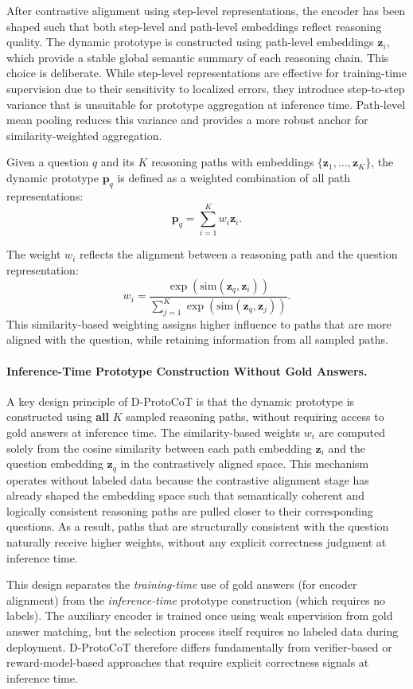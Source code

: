 \documentclass[a4paper,fleqn]{cas-dc}
\begin{document}
After contrastive alignment using step-level representations, the encoder has been shaped such that both step-level and path-level embeddings reflect reasoning quality.
The dynamic prototype is constructed using path-level embeddings $\mathbf{z}_i$, which provide a stable global semantic summary of each reasoning chain.
This choice is deliberate. While step-level representations are effective for training-time supervision due to their sensitivity to localized errors, they introduce step-to-step variance that is unsuitable for prototype aggregation at inference time.
Path-level mean pooling reduces this variance and provides a more robust anchor for similarity-weighted aggregation.

Given a question $q$ and its $K$ reasoning paths with embeddings $\{\mathbf{z}_1, \ldots, \mathbf{z}_K\}$, the dynamic prototype $\mathbf{p}_q$ is defined as a weighted combination of all path representations:
\[
\mathbf{p}_q = \sum_{i=1}^{K} w_i \mathbf{z}_i.
\]

The weight $w_i$ reflects the alignment between a reasoning path and the question representation:
\[
w_i = \frac{\exp(\text{sim}(\mathbf{z}_q, \mathbf{z}_i))}{\sum_{j=1}^{K} \exp(\text{sim}(\mathbf{z}_q, \mathbf{z}_j))}.
\]
This similarity-based weighting assigns higher influence to paths that are more aligned with the question, while retaining information from all sampled paths.

\paragraph{Inference-Time Prototype Construction Without Gold Answers.}
A key design principle of D-ProtoCoT is that the dynamic prototype is constructed using \textbf{all} $K$ sampled reasoning paths, without requiring access to gold answers at inference time.
The similarity-based weights $w_i$ are computed solely from the cosine similarity between each path embedding $\mathbf{z}_i$ and the question embedding $\mathbf{z}_q$ in the contrastively aligned space.
This mechanism operates without labeled data because the contrastive alignment stage has already shaped the embedding space such that semantically coherent and logically consistent reasoning paths are pulled closer to their corresponding questions.
As a result, paths that are structurally consistent with the question naturally receive higher weights, without any explicit correctness judgment at inference time.

This design separates the \textit{training-time} use of gold answers (for encoder alignment) from the \textit{inference-time} prototype construction (which requires no labels).
The auxiliary encoder is trained once using weak supervision from gold answer matching, but the selection process itself requires no labeled data during deployment.
D-ProtoCoT therefore differs fundamentally from verifier-based or reward-model-based approaches that require explicit correctness signals at inference time.
\end{document}
